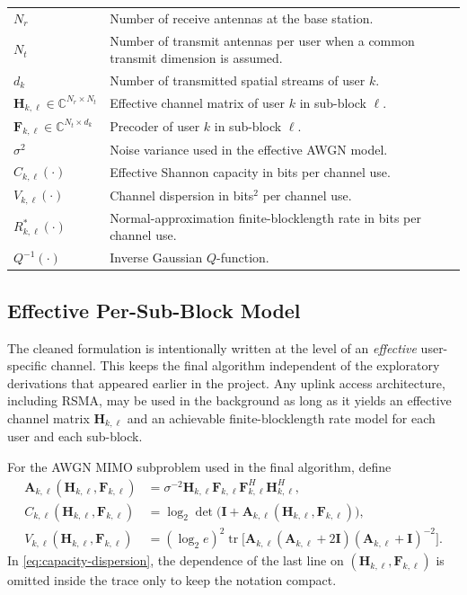 \documentclass[11pt]{article}
\newcommand{\C}{\mathbb{C}}
\newcommand{\F}{\mathbf{F}}
\newcommand{\Hc}{\mathbf{H}}
\newcommand{\I}{\mathbf{I}}
\newcommand{\A}{\mathbf{A}}
\newcommand{\tr}{\operatorname{tr}}
\begin{document}
\begin{table}[ht]
\begin{tabularx}{\textwidth}{>{\raggedright\arraybackslash}p{} X}
$N_r$ & Number of receive antennas at the base station. \\
$N_t$ & Number of transmit antennas per user when a common transmit dimension is assumed. \\
$d_k$ & Number of transmitted spatial streams of user $k$. \\
$\Hc_{k,\ell} \in \C^{N_r \times N_t}$ & Effective channel matrix of user $k$ in sub-block $\ell$. \\
$\F_{k,\ell} \in \C^{N_t \times d_k}$ & Precoder of user $k$ in sub-block $\ell$. \\
$\sigma^2$ & Noise variance used in the effective AWGN model. \\
$C_{k,\ell}(\cdot)$ & Effective Shannon capacity in bits per channel use. \\
$V_{k,\ell}(\cdot)$ & Channel dispersion in bits$^2$ per channel use. \\
$R_{k,\ell}^*(\cdot)$ & Normal-approximation finite-blocklength rate in bits per channel use. \\
$Q^{-1}(\cdot)$ & Inverse Gaussian $Q$-function. \\
\bottomrule
\end{tabularx}
\end{table}

\subsection{Effective Per-Sub-Block Model}
The cleaned formulation is intentionally written at the level of an \emph{effective} user-specific channel. This keeps the final algorithm independent of the exploratory derivations that appeared earlier in the project. Any uplink access architecture, including RSMA, may be used in the background as long as it yields an effective channel matrix $\Hc_{k,\ell}$ and an achievable finite-blocklength rate model for each user and each sub-block.

For the AWGN MIMO subproblem used in the final algorithm, define
\begin{align}
\A_{k,\ell}(\Hc_{k,\ell},\F_{k,\ell})
&=
\sigma^{-2}\Hc_{k,\ell}\F_{k,\ell}\F_{k,\ell}^H\Hc_{k,\ell}^H,
\\
C_{k,\ell}(\Hc_{k,\ell},\F_{k,\ell})
&=
\log_2\det\!\bigl(\I + \A_{k,\ell}(\Hc_{k,\ell},\F_{k,\ell})\bigr),
\\
V_{k,\ell}(\Hc_{k,\ell},\F_{k,\ell})
&=
(\log_2 e)^2
\tr\!\Big[
\A_{k,\ell}(\A_{k,\ell}+2\I)(\A_{k,\ell}+\I)^{-2}
\Big].
\label{eq:capacity-dispersion}
\end{align}
In \eqref{eq:capacity-dispersion}, the dependence of the last line on $(\Hc_{k,\ell},\F_{k,\ell})$ is omitted inside the trace only to keep the notation compact.
\end{document}
